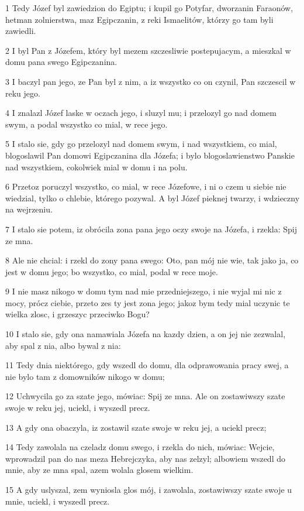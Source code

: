 \par 1 Tedy Józef byl zawiedzion do Egiptu; i kupil go Potyfar, dworzanin Faraonów, hetman zolnierstwa, maz Egipczanin, z reki Ismaelitów, którzy go tam byli zawiedli.
\par 2 I byl Pan z Józefem, który byl mezem szczesliwie postepujacym, a mieszkal w domu pana swego Egipczanina.
\par 3 I baczyl pan jego, ze Pan byl z nim, a iz wszystko co on czynil, Pan szczescil w reku jego.
\par 4 I znalazl Józef laske w oczach jego, i sluzyl mu; i przelozyl go nad domem swym, a podal wszystko co mial, w rece jego.
\par 5 I stalo sie, gdy go przelozyl nad domem swym, i nad wszystkiem, co mial, blogoslawil Pan domowi Egipczanina dla Józefa; i bylo blogoslawienstwo Panskie nad wszystkiem, cokolwiek mial w domu i na polu.
\par 6 Przetoz poruczyl wszystko, co mial, w rece Józefowe, i ni o czem u siebie nie wiedzial, tylko o chlebie, którego pozywal. A byl Józef pieknej twarzy, i wdzieczny na wejrzeniu.
\par 7 I stalo sie potem, iz obrócila zona pana jego oczy swoje na Józefa, i rzekla: Spij ze mna.
\par 8 Ale nie chcial: i rzekl do zony pana swego: Oto, pan mój nie wie, tak jako ja, co jest w domu jego; bo wszystko, co mial, podal w rece moje.
\par 9 I nie masz nikogo w domu tym nad mie przedniejszego, i nie wyjal mi nic z mocy, prócz ciebie, przeto zes ty jest zona jego; jakoz bym tedy mial uczynic te wielka zlosc, i grzeszyc przeciwko Bogu?
\par 10 I stalo sie, gdy ona namawiala Józefa na kazdy dzien, a on jej nie zezwalal, aby spal z nia, albo bywal z nia:
\par 11 Tedy dnia niektórego, gdy wszedl do domu, dla odprawowania pracy swej, a nie bylo tam z domowników nikogo w domu;
\par 12 Uchwycila go za szate jego, mówiac: Spij ze mna. Ale on zostawiwszy szate swoje w reku jej, uciekl, i wyszedl precz.
\par 13 A gdy ona obaczyla, iz zostawil szate swoje w reku jej, a uciekl precz;
\par 14 Tedy zawolala na czeladz domu swego, i rzekla do nich, mówiac: Wejcie, wprowadzil pan do nas meza Hebrejczyka, aby nas zelzyl; albowiem wszedl do mnie, aby ze mna spal, azem wolala glosem wielkim.
\par 15 A gdy uslyszal, zem wyniosla glos mój, i zawolala, zostawiwszy szate swoje u mnie, uciekl, i wyszedl precz.
